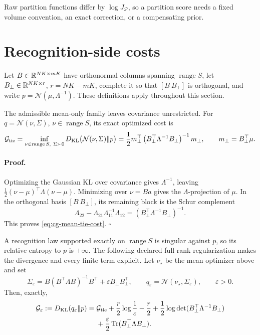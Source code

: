 Raw partition functions differ by \(\log J_{\mathcal P}\), so a partition
score needs a fixed volume convention, an exact correction, or a compensating
prior. 

\section{Recognition-side costs}
\label{sec:cg-restriction-costs}

Let \(B\in\mathbb R^{NK\times mK}\) have orthonormal columns spanning
\(\operatorname{range}S\), let
\(B_\perp\in\mathbb R^{NK\times r}\), \(r=NK-mK\), complete it so that
\([B\ B_\perp]\) is orthogonal, and write
\(p=\mathcal N(\mu,\Lambda^{-1})\). These definitions apply throughout this
section.

The admissible mean-only family leaves covariance unrestricted. For
\(q=\mathcal N(\nu,\Sigma)\), \(\nu\in\operatorname{range}S\), its exact
optimized cost is
\begin{equation}
\mathcal G_{\rm tie}
=\inf_{\nu\in\operatorname{range}S,\ \Sigma\succ0}
D_{\mathrm{KL}}\bigl(\mathcal N(\nu,\Sigma)\Vert p\bigr)
=\frac12m_\perp^\top
\left(B_\perp^\top\Lambda^{-1}B_\perp\right)^{-1}m_\perp,
\qquad
m_\perp=B_\perp^\top\mu.
\label{eq:cg-mean-tie-cost}
\end{equation}

\paragraph{Proof.}
Optimizing the Gaussian KL over covariance gives
\(\Lambda^{-1}\), leaving
\(\frac12(\nu-\mu)^\top\Lambda(\nu-\mu)\). Minimizing over
\(\nu=Ba\) gives the \(\Lambda\)-projection of \(\mu\). In the orthogonal
basis \([B\ B_\perp]\), its remaining block is the Schur complement
\[
\Lambda_{22}-\Lambda_{21}\Lambda_{11}^{-1}\Lambda_{12}
=\left(B_\perp^\top\Lambda^{-1}B_\perp\right)^{-1}.
\]
This proves \eqref{eq:cg-mean-tie-cost}. \(\square\)

A recognition law supported exactly on \(\operatorname{range}S\) is singular
against \(p\), so its relative entropy to \(p\) is \(+\infty\). The following
declared full-rank regularization makes the divergence and every finite term
explicit. Let \(\nu_\star\) be the mean optimizer above and set
\begin{equation}
\Sigma_\varepsilon
=B(B^\top\Lambda B)^{-1}B^\top
+\varepsilon B_\perp B_\perp^\top,
\qquad
q_\varepsilon=\mathcal N(\nu_\star,\Sigma_\varepsilon),
\qquad \varepsilon>0.
\label{eq:cg-epsilon-regularized-law}
\end{equation}
Then, exactly,
\begin{equation}
\begin{aligned}
\mathcal G_\varepsilon
:=D_{\mathrm{KL}}(q_\varepsilon\Vert p)
={}&\mathcal G_{\rm tie}
+\frac{r}{2}\log\frac1\varepsilon-\frac r2
+\frac12\log\det(B_\perp^\top\Lambda^{-1}B_\perp)\\
&+\frac{\varepsilon}{2}
\operatorname{Tr}(B_\perp^\top\Lambda B_\perp).
\end{aligned}
\label{eq:cg-epsilon-divergence}
\end{equation}

